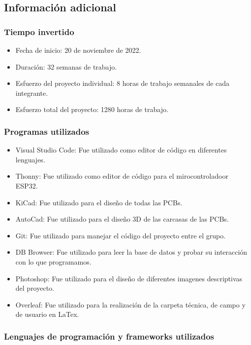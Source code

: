 \subsection{Información adicional}

\subsubsection{Tiempo invertido}

\begin{itemize}
\item Fecha de inicio: 20 de noviembre de 2022.
\item Duración: 32 semanas de trabajo.
\item Esfuerzo del proyecto individual: 8 horas de trabajo semanales de cada integrante.
\item Esfuerzo total del proyecto: 1280 horas de trabajo.
\end{itemize}

\subsubsection{Programas utilizados}

\begin{itemize}
\item Visual Studio Code: Fue utilizado como editor de código en diferentes lenguajes.
\item Thonny: Fue utilizado como editor de código para el mirocontroladoor ESP32.
\item KiCad: Fue utilizado para el diseño de todas las PCBs.
\item AutoCad: Fue utilizado para el diseño 3D de las carcasas de las PCBs.
\item Git: Fue utilizado para manejar el código del proyecto entre el grupo.
\item DB Browser: Fue utilizado para leer la base de datos y probar su interacción con lo que programamos.
\item Photoshop: Fue utilizado para el diseño de diferentes imagenes descriptivas del proyecto.
\item Overleaf: Fue utilizado para la realización de la carpeta técnica, de campo y de usuario en LaTex.
\end{itemize}

\subsubsection{Lenguajes de programación y frameworks utilizados}

